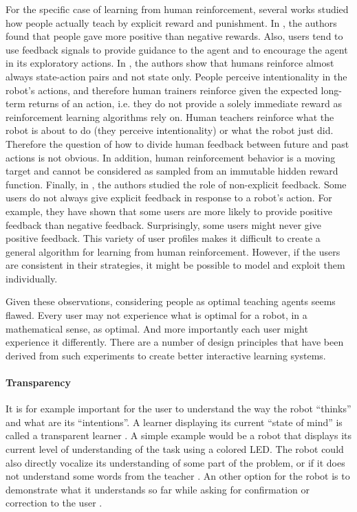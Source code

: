 For the specific case of learning from human reinforcement, several works studied how people actually teach by explicit reward and punishment. In \cite{thomaz2006reinforcement}, the authors found that people gave more positive than negative rewards. Also, users tend to use feedback signals to provide guidance to the agent and to encourage the agent in its exploratory actions. In \cite{knox2009design}, the authors show that humans reinforce almost always state-action pairs and not state only. People perceive intentionality in the robot's actions, and therefore human trainers reinforce given the expected long-term returns of an action, i.e. they do not provide a solely immediate reward as reinforcement learning algorithms rely on. Human teachers reinforce what the robot is about to do (they perceive intentionality) or what the robot just did. Therefore the question of how to divide human feedback between future and past actions is not obvious. In addition, human reinforcement behavior is a moving target and cannot be considered as sampled from an immutable hidden reward function. Finally, in \cite{loftinlearning}, the authors studied the role of non-explicit feedback. Some users do not always give explicit feedback in response to a robot's action. For example, they have shown that some users are more likely to provide positive feedback than negative feedback. Surprisingly, some users might never give positive feedback. This variety of user profiles makes it difficult to create a general algorithm for learning from human reinforcement. However, if the users are consistent in their strategies, it might be possible to model and exploit them individually. 

Given these observations, considering people as optimal teaching agents seems flawed. Every user may not experience what is optimal for a robot, in a mathematical sense, as optimal. And more importantly each user might experience it differently. There are a number of design principles that have been derived from such experiments to create better interactive learning systems.

\paragraph{Transparency} It is for example important for the user to understand the way the robot ``thinks'' and what are its ``intentions''. A learner displaying its current ``state of mind'' is called a transparent learner \cite{thomaz2008teachable}. A simple example would be a robot that displays its current level of understanding of the task using a colored LED. The robot could also directly vocalize its understanding of some part of the problem, or if it does not understand some words from the teacher \cite{chao2010transparent}. An other option for the robot is to demonstrate what it understands so far while asking for confirmation or correction to the user \cite{cakmak2012designing}.

